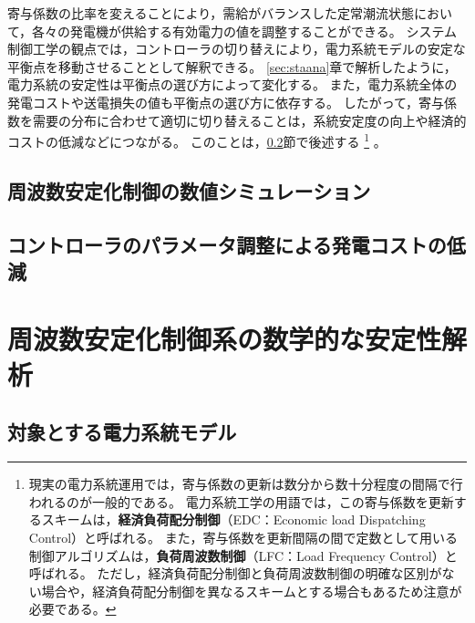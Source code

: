 \documentclass[tombow,dvipdfmx]{corona-a5-1.1}
\begin{document}
寄与係数の比率を変えることにより，需給がバランスした定常潮流状態において，各々の発電機が供給する有効電力の値を調整することができる。
システム制御工学の観点では，コントローラの切り替えにより，電力系統モデルの安定な平衡点を移動させることとして解釈できる。
\ref{sec:staana}章で解析したように，電力系統の安定性は平衡点の選び方によって変化する。
また，電力系統全体の発電コストや送電損失の値も平衡点の選び方に依存する。
したがって，寄与係数を需要の分布に合わせて適切に切り替えることは，系統安定度の向上や経済的コストの低減などにつながる。
このことは，\ref{sec:conpeco}節で後述する
\footnote{
現実の電力系統運用では，寄与係数の更新は数分から数十分程度の間隔で行われるのが一般的である\cite[第11.1節]{kundur1994power}。
電力系統工学の用語では，この寄与係数を更新するスキームは，\textbf{経済負荷配分制御}（EDC：Economic load Dispatching Control）と呼ばれる。
また，寄与係数を更新間隔の間で定数として用いる制御アルゴリズムは，\textbf{負荷周波数制御}（LFC：Load Frequency Control）と呼ばれる。
ただし，経済負荷配分制御と負荷周波数制御の明確な区別がない場合や，経済負荷配分制御を異なるスキームとする場合もあるため注意が必要である。
}
。


\subsection{周波数安定化制御の数値シミュレーション}

\begin{例}[xxx]
\end{例}

\subsection{コントローラのパラメータ調整による発電コストの低減}\label{sec:conpeco}

\begin{例}[xxx]
\end{例}


\section{周波数安定化制御系の数学的な安定性解析\advanced}

\subsection{対象とする電力系統モデル\advanced}\label{sec:objmod}
\end{document}
